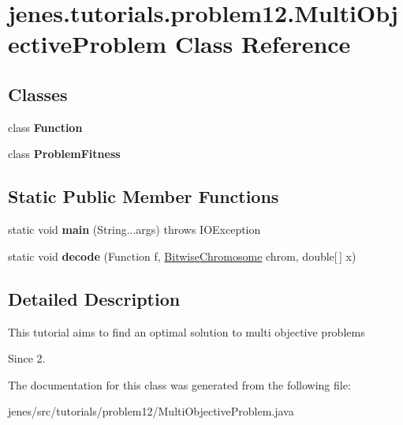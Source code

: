 \hypertarget{classjenes_1_1tutorials_1_1problem12_1_1_multi_objective_problem}{\section{jenes.\-tutorials.\-problem12.\-Multi\-Objective\-Problem Class Reference}
\label{classjenes_1_1tutorials_1_1problem12_1_1_multi_objective_problem}
}
\subsection*{Classes}
\begin{DoxyCompactItemize}
\item 
class {\bfseries Function}
\item 
class {\bfseries Problem\-Fitness}
\end{DoxyCompactItemize}
\subsection*{Static Public Member Functions}
\begin{DoxyCompactItemize}
\item 
\hypertarget{classjenes_1_1tutorials_1_1problem12_1_1_multi_objective_problem_a8e1b0d92b909d867c5b21b7c8eb866cb}{static void {\bfseries main} (String...\-args)  throws I\-O\-Exception }\label{classjenes_1_1tutorials_1_1problem12_1_1_multi_objective_problem_a8e1b0d92b909d867c5b21b7c8eb866cb}

\item 
\hypertarget{classjenes_1_1tutorials_1_1problem12_1_1_multi_objective_problem_ad2990b1d319fa2357e088d12e32f6634}{static void {\bfseries decode} (Function f, \hyperlink{classjenes_1_1chromosome_1_1_bitwise_chromosome}{Bitwise\-Chromosome} chrom, double\mbox{[}$\,$\mbox{]} x)}\label{classjenes_1_1tutorials_1_1problem12_1_1_multi_objective_problem_ad2990b1d319fa2357e088d12e32f6634}

\end{DoxyCompactItemize}


\subsection{Detailed Description}
This tutorial aims to find an optimal solution to multi objective problems

\begin{DoxySince}{Since}
2. 
\end{DoxySince}


The documentation for this class was generated from the following file\-:\begin{DoxyCompactItemize}
\item 
jenes/src/tutorials/problem12/Multi\-Objective\-Problem.\-java\end{DoxyCompactItemize}
